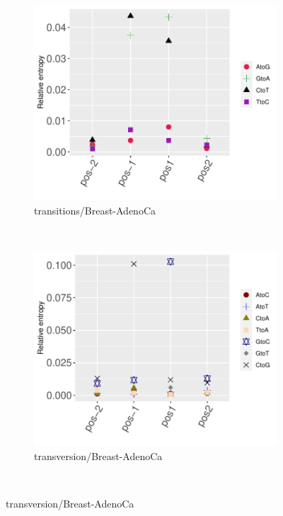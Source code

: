 \begin{figure}[ht!]
    \begin{subfigure}{.5\textwidth}
    \includegraphics[scale=0.63]{graphics/nbr_transitions_Breast-AdenoCa.pdf}
    \caption{transitions/Breast-AdenoCa}
    \label{fig:transitions_breast-adenoca}
    \end{subfigure}
    ~
    \begin{subfigure}{.5\textwidth}
    \includegraphics[scale=0.63]{graphics/nbr_transversion_Breast-AdenoCa.pdf}
    \caption{transversion/Breast-AdenoCa}
    \label{fig:transversion_breast-adenoca}
    \end{subfigure} \\
    \vspace{0.5cm}
    

\end{figure}
